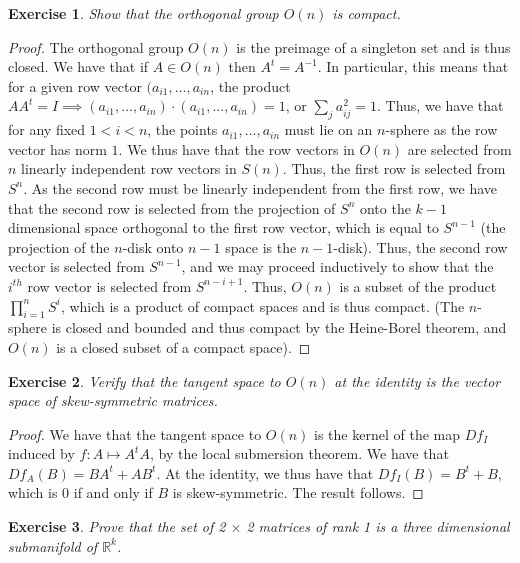 \message{ !name(Homework3.tex)}\documentclass{article}
\newtheorem{exercise}{Exercise}
\begin{document}
\begin{exercise}
Show that the orthogonal group $O(n)$ is compact.
\end{exercise}

\begin{proof}
The orthogonal group $O(n)$ is the preimage of a singleton set and is thus closed. We have that if $A \in O(n)$ then $A^{t} = A^{-1}$. In particular, this means that for a given row vector $(a_{i1},...,a_{in}$, the product $AA^{t} = I \implies (a_{i1},...,a_{in}) \cdot (a_{i1},...,a_{in}) = 1$, or $\sum_{j}a_{ij}^{2} = 1$. Thus, we have that for any fixed $1< i < n$, the points $a_{i1},...,a_{in}$ must lie on an $n$-sphere as the row vector has norm $1$. We thus have that the row vectors in $O(n)$ are selected from $n$ linearly independent row vectors in $S(n)$. Thus, the first row is selected from $S^{n}$. As the second row must be linearly independent from the first row, we have that the second row is selected from the projection of $S^{n}$ onto the $k-1$ dimensional space orthogonal to the first row vector, which is equal to $S^{n-1}$ (the projection of the $n$-disk onto $n-1$ space is the $n-1$-disk). Thus, the second row vector is selected from $S^{n-1}$, and we may proceed inductively to show that the $i^{th}$ row vector is selected from $S^{n-i + 1}$. Thus, $O(n)$ is a subset of the product $\prod_{i=1}^{n} S^{i}$, which is a product of compact spaces and is thus compact. (The $n$-sphere is closed and bounded and thus compact by the Heine-Borel theorem, and $O(n)$ is a closed subset of a compact space).   
\end{proof}

\begin{exercise}
  Verify that the tangent space to $O(n)$ at the identity is the vector space of skew-symmetric matrices. 
\end{exercise}

\begin{proof}
We have that the tangent space to $O(n)$ is the kernel of the map $Df_{I}$ induced by $f: A \mapsto A^{t}A$, by the local submersion theorem. We have that $Df_{A}(B) = BA^{t} + AB^{t}$. At the identity, we thus have that $Df_{I}(B) = B^{t} + B$, which is 0 if and only if $B$ is skew-symmetric. The result follows. 
\end{proof}

\pagebreak

\begin{exercise}
Prove that the set of 2 $\times$ 2 matrices of rank 1 is a three dimensional submanifold of $\mathbb{R}^{k}$. 
\end{exercise}
\end{document}
